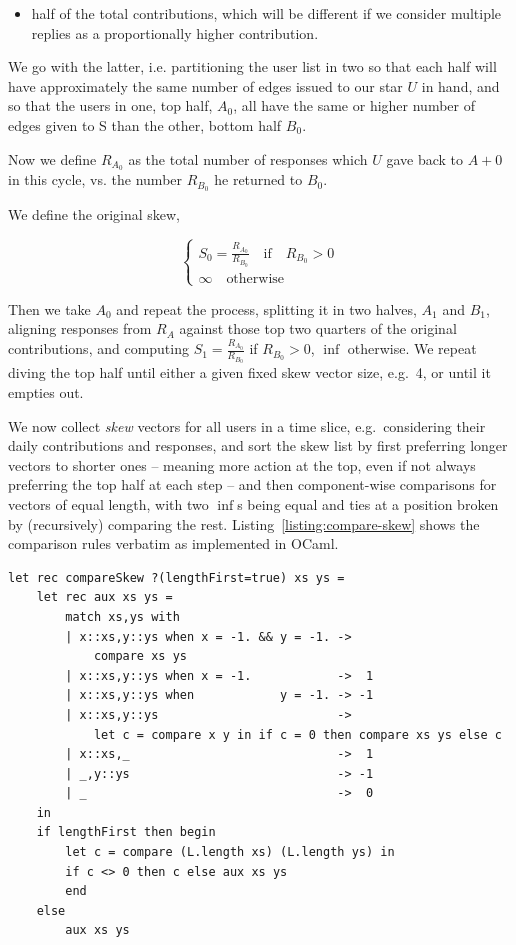 \documentclass[10pt,oneside]{memoir}
\begin{document}
\begin{Spacing}{2}
\begin{itemize}
\item half of the total contributions, which will be different if we consider multiple replies as a proportionally higher contribution.
\end{itemize}


We go with the latter, i.e. partitioning the user list in two so that each half will have approximately the same number of edges issued to our star $U$ in hand, and so that the users in one, top half, $A_0$, all have the same or higher number of edges given to S than the other, bottom half $B_0$.

Now we define $R_{A_0}$ as the total number of responses  which $U$ gave back to $A+0$ in this cycle, vs. the number $R_{B_0}$ he returned to $B_0$.

We define the original skew,

\[
\left\lbrace
\begin{array}{l}
    S_0 = \frac{R_{A_0}}{R_{B_0}} \quad\mbox{if}\quad R_{B_0} > 0 \\
    \infty \quad\mbox{otherwise} 
\end{array}
\right.
\]

Then we take $A_0$ and repeat the process, splitting it in two halves, $A_1$ and $B_1$, aligning responses from $R_A$ against those top two quarters of the original contributions, and computing $S_1 = \frac{R_{A_0}}{R_{B_0}}$ if $R_{B_0} > 0$, $\inf$ otherwise.
We repeat diving the top half until either a given fixed skew vector size, e.g.\ 4, or until it empties out.


We now collect {\itshape skew} vectors for all users in a time slice, e.g.\ considering their daily contributions and responses, and sort the skew list by first preferring longer vectors to shorter ones -- meaning more action at the top, even if not always preferring the top half at each step -- and then component-wise comparisons for vectors of equal length, with two $\inf$s being equal and ties at a position broken by (recursively) comparing the rest.  Listing~\ref{listing:compare-skew} shows the comparison rules verbatim as implemented in OCaml.



\begin{lstlisting}
let rec compareSkew ?(lengthFirst=true) xs ys =
    let rec aux xs ys =
        match xs,ys with
        | x::xs,y::ys when x = -1. && y = -1. ->
            compare xs ys
        | x::xs,y::ys when x = -1.            ->  1
        | x::xs,y::ys when            y = -1. -> -1
        | x::xs,y::ys                         -> 
            let c = compare x y in if c = 0 then compare xs ys else c
        | x::xs,_                             ->  1
        | _,y::ys                             -> -1
        | _                                   ->  0
    in
    if lengthFirst then begin
        let c = compare (L.length xs) (L.length ys) in
        if c <> 0 then c else aux xs ys
        end
    else
        aux xs ys


\end{lstlisting}
\end{Spacing}
\end{document}
